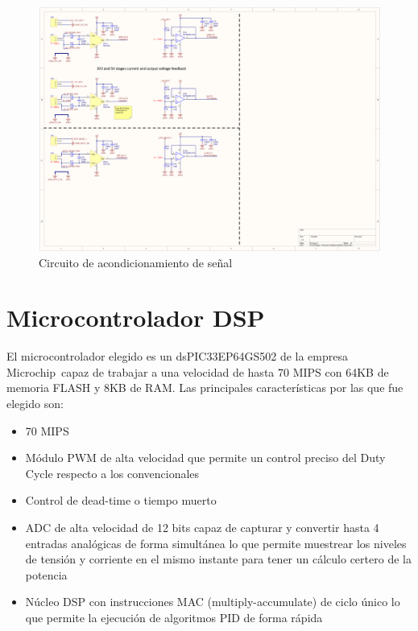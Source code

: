 \documentclass[12pt]{report}
\begin{document}
\begin{figure}
	\centering
	\includegraphics[width=\textwidth,height=\textheight,keepaspectratio]{sch_control_feedback} 
	\caption{Circuito de acondicionamiento de señal}
	\label{control:feedback}
\end{figure}

\section{Microcontrolador DSP}

El microcontrolador elegido es un dsPIC33EP64GS502 de la empresa Microchip\textregistered \ capaz de trabajar a una velocidad de hasta 70 MIPS con 64KB de memoria FLASH y 8KB de RAM. Las principales características por las que fue elegido son:

\begin{itemize}
	\item 70 MIPS
	\item Módulo PWM de alta velocidad que permite un control preciso del Duty Cycle respecto a los convencionales
	\item Control de dead-time o tiempo muerto
	\item ADC de alta velocidad de 12 bits capaz de capturar y convertir hasta 4 entradas analógicas de forma simultánea lo que permite muestrear los niveles de tensión y corriente en el mismo instante para tener un cálculo certero de la potencia
	\item Núcleo DSP con instrucciones MAC (multiply-accumulate) de ciclo único lo que permite la ejecución de algoritmos PID de forma rápida
\end{itemize} 
\end{document}
